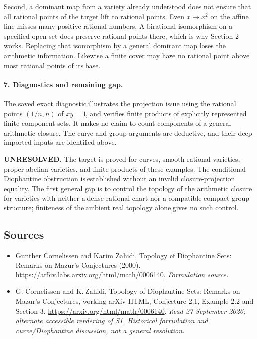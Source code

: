 \documentclass[11pt]{article}
\begin{document}
Second, a dominant map from a variety already understood does not ensure that all rational points of the target lift to rational points. Even $x\mapsto x^2$ on the affine line misses many positive rational numbers. A birational isomorphism on a specified open set does preserve rational points there, which is why Section 2 works. Replacing that isomorphism by a general dominant map loses the arithmetic information. Likewise a finite cover may have no rational point above most rational points of its base.

\paragraph{7. Diagnostics and remaining gap.}
The saved exact diagnostic illustrates the projection issue using the rational points $(1/n,n)$ of $xy=1$, and verifies finite products of explicitly represented finite component sets. It makes no claim to count components of a general arithmetic closure. The curve and group arguments are deductive, and their deep imported inputs are identified above.

\textbf{UNRESOLVED.} The target is proved for curves, smooth rational varieties, proper abelian varieties, and finite products of these examples. The conditional Diophantine obstruction is established without an invalid closure-projection equality. The first general gap is to control the topology of the arithmetic closure for varieties with neither a dense rational chart nor a compatible compact group structure; finiteness of the ambient real topology alone gives no such control.

\subsection{Sources}
\begin{itemize}
\item[S1]Gunther Cornelissen and Karim Zahidi, Topology of Diophantine Sets: Remarks on Mazur's Conjectures (2000).
\url{https://ar5iv.labs.arxiv.org/html/math/0006140}.
\textit{Formulation source.}
\item[E1]G. Cornelissen and K. Zahidi, Topology of Diophantine Sets: Remarks on Mazur's Conjectures, working arXiv HTML, Conjecture 2.1, Example 2.2 and Section 3.
\url{https://arxiv.org/html/math/0006140}.
\textit{Read 27 September 2026; alternate accessible rendering of S1. Historical formulation and curve/Diophantine discussion, not a general resolution.}
\end{itemize}
\end{document}
